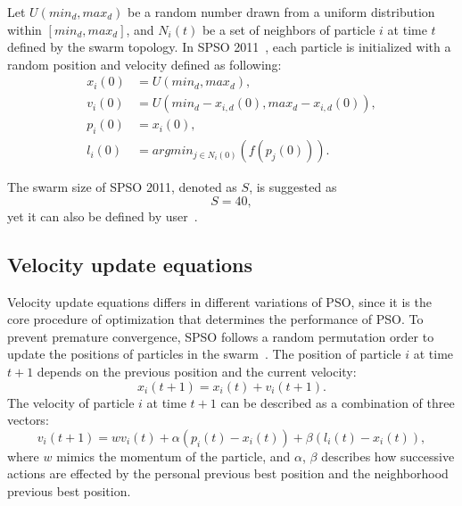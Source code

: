 Let $U(min_d, max_d)$ be a random number drawn from a uniform distribution within $[min_d, max_d]$, 
and $N_i(t)$ be a set of neighbors of particle $i$ at time $t$ defined by the swarm topology.
In SPSO 2011~\cite{Clerc:2012:SPSO2011}, each particle is initialized with a random position and velocity defined as following:
\begin{align*}
x_i(0) &= U(min_d, max_d), \\
v_i(0) &= U(min_d - x_{i,d}(0), max_d - x_{i,d}(0)), \\
p_i(0) &= x_i(0), \\ 
l_i(0) &= argmin_{j \in N_i(0)}(f(p_j(0))).
\end{align*}


The swarm size of SPSO 2011, denoted as $S$, is suggested as
\begin{displaymath}
S = 40,
\end{displaymath}
yet it can also be defined by user~\cite{Clerc:2012:SPSO2011}.


\subsection{Velocity update equations}

Velocity update equations differs in different variations of PSO, 
since it is the core procedure of optimization that determines the performance of PSO.
To prevent premature convergence, 
SPSO follows a random permutation order to update the positions of particles in the swarm~\cite{Clerc:2012:SPSO2011}.
The position of particle $i$ at time $t+1$ depends on the previous position and the current velocity:
\begin{displaymath}
x_i(t+1) = x_i(t) + v_i(t+1).
\end{displaymath}
The velocity of particle $i$ at time $t+1$ can be described as a combination of three vectors:
\begin{displaymath}
v_i(t+1) = w v_i(t) + \alpha (p_i(t) - x_i(t)) + \beta (l_i(t) - x_i(t)),
\end{displaymath}
where $w$ mimics the momentum of the particle, and $\alpha$, $\beta$ describes how successive actions are effected by the personal previous best position and the neighborhood previous best position.

